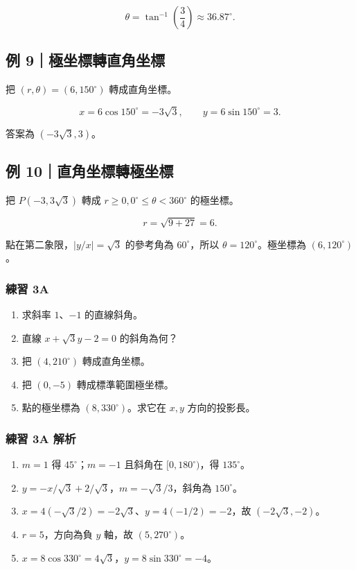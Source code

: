 \documentclass[11pt,a4paper]{article}
\providecommand{\tightlist}{%
  \setlength{\itemsep}{0pt}\setlength{\parskip}{0pt}}
\begin{document}
\[
\theta=\tan^{-1}\!\left(\frac34\right)\approx\boxed{36.87^\circ}.
\]

\subsection{例 9｜極坐標轉直角坐標}\label{ux4f8b-9ux6975ux5750ux6a19ux8f49ux76f4ux89d2ux5750ux6a19}

把 \((r,\theta)=(6,150^\circ)\) 轉成直角坐標。

\[
x=6\cos150^\circ=-3\sqrt3,\qquad
y=6\sin150^\circ=3.
\]

答案為 \(\boxed{(-3\sqrt3,3)}\)。

\subsection{例 10｜直角坐標轉極坐標}\label{ux4f8b-10ux76f4ux89d2ux5750ux6a19ux8f49ux6975ux5750ux6a19}

把 \(P(-3,3\sqrt3)\) 轉成 \(r\ge0,0^\circ\le\theta<360^\circ\) 的極坐標。

\[
r=\sqrt{9+27}=6.
\]

點在第二象限，\(|y/x|=\sqrt3\) 的參考角為 \(60^\circ\)，所以 \(\theta=120^\circ\)。極坐標為 \(\boxed{(6,120^\circ)}\)。

\subsubsection{練習 3A}\label{ux7df4ux7fd2-3a}

\begin{enumerate}
\def\labelenumi{\arabic{enumi}.}
\tightlist
\item
  求斜率 \(1\)、\(-1\) 的直線斜角。
\item
  直線 \(x+\sqrt3y-2=0\) 的斜角為何？
\item
  把 \((4,210^\circ)\) 轉成直角坐標。
\item
  把 \((0,-5)\) 轉成標準範圍極坐標。
\item
  點的極坐標為 \((8,330^\circ)\)。求它在 \(x,y\) 方向的投影長。
\end{enumerate}

\subsubsection{練習 3A 解析}\label{ux7df4ux7fd2-3a-ux89e3ux6790}

\begin{enumerate}
\def\labelenumi{\arabic{enumi}.}
\tightlist
\item
  \(m=1\) 得 \(\boxed{45^\circ}\)；\(m=-1\) 且斜角在 \([0,180^\circ)\)，得 \(\boxed{135^\circ}\)。
\item
  \(y=-x/\sqrt3+2/\sqrt3\)，\(m=-\sqrt3/3\)，斜角為 \(\boxed{150^\circ}\)。
\item
  \(x=4(-\sqrt3/2)=-2\sqrt3\)、\(y=4(-1/2)=-2\)，故 \(\boxed{(-2\sqrt3,-2)}\)。
\item
  \(r=5\)，方向為負 \(y\) 軸，故 \(\boxed{(5,270^\circ)}\)。
\item
  \(x=8\cos330^\circ=\boxed{4\sqrt3}\)，\(y=8\sin330^\circ=\boxed{-4}\)。
\end{enumerate}
\end{document}
